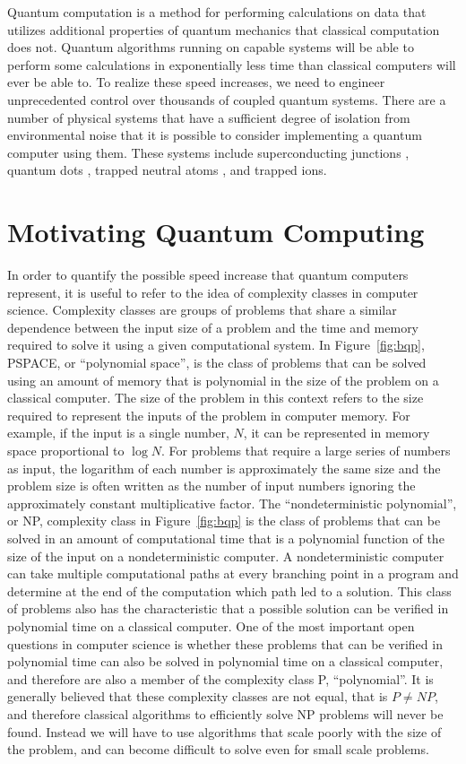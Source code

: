 
\graphicspath{ {\curdir/Graphics/}  }

Quantum computation is a method for performing calculations on data that utilizes additional properties of quantum mechanics that classical computation does not.  Quantum algorithms running on capable systems will be able to perform some calculations in exponentially less time than classical computers will ever be able to.  To realize these speed increases, we need to engineer unprecedented control over thousands of coupled quantum systems.  There are a number of physical systems that have a sufficient degree of isolation from environmental noise that it is possible to consider implementing a quantum computer using them.  These systems include superconducting junctions \cite{Devoret:13}, quantum dots \cite{Kloeffell:13}, trapped neutral atoms \cite{Saffman:10}, and trapped ions.

\section{Motivating Quantum Computing}
In order to quantify the possible speed increase that quantum computers represent, it is useful to refer to the idea of complexity classes in computer science.  Complexity classes are groups of problems that share a similar dependence between the input size of a problem and the time and memory required to solve it using a given computational system.  In Figure~\ref{fig:bqp}, PSPACE, or ``polynomial space'', is the class of problems that can be solved using an amount of memory that is polynomial in the size of the problem on a classical computer.  The size of the problem in this context refers to the size required to represent the inputs of the problem in computer memory.  For example, if the input is a single number, $N$, it can be represented in memory space proportional to $\log{N}$.  For problems that require a large series of numbers as input, the logarithm of each number is approximately the same size and the problem size is often written as the number of input numbers ignoring the approximately constant multiplicative factor.  The ``nondeterministic polynomial'', or NP, complexity class in Figure~\ref{fig:bqp} is the class of problems that can be solved in an amount of computational time that is a polynomial function of the size of the input on a nondeterministic computer.  A nondeterministic computer can take multiple computational paths at every branching point in a program and determine at the end of the computation which path led to a solution.  This class of problems also has the characteristic that a possible solution can be verified in polynomial time on a classical computer.  One of the most important open questions in computer science is whether these problems that can be verified in polynomial time can also be solved in polynomial time on a classical computer, and therefore are also a member of the complexity class P, ``polynomial''.  It is generally believed that these complexity classes are not equal, that is $P \ne NP$, and therefore classical algorithms to efficiently solve NP problems will never be found.  Instead we will have to use algorithms that scale poorly with the size of the problem, and can become difficult to solve even for small scale problems.

